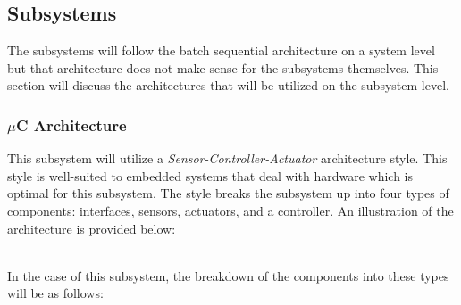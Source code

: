 \documentclass[titlepage]{article}
\begin{document}
\subsection{Subsystems}
The subsystems will follow the batch sequential architecture on a system level but that architecture does not make sense for the subsystems themselves. This section will discuss the architectures that will be utilized on the subsystem level.
\subsubsection{$\mu$C Architecture}
This subsystem will utilize a \textit{Sensor-Controller-Actuator} architecture style. This style is well-suited to embedded systems that deal with hardware which is optimal for this subsystem. The style breaks the subsystem up into four types of components: interfaces, sensors, actuators, and a controller. An illustration of the architecture is provided below:\\
\begin{center}
\label{fig:Sensor-Controller-Actuator Architecture}
\end{center}~\\
In the case of this subsystem, the breakdown of the components into these types will be as follows:
\end{document}
